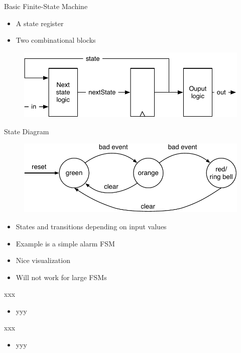 \begin{frame}[fragile]{Basic Finite-State Machine}
\begin{itemize}
\item A state register
\item Two combinational blocks
\end{itemize}
\begin{figure}
  \includegraphics[scale=\scale]{../figures/fsm}
\end{figure}
\end{frame}

\begin{frame}[fragile]{State Diagram}
\begin{figure}
  \includegraphics[scale=\scale]{../figures/state-diag-moore}
\end{figure}
\begin{itemize}
\item States and transitions depending on input values
\item Example is a simple alarm FSM
\item Nice visualization
\item Will not work for large FSMs
\end{itemize}
\end{frame}


\begin{frame}[fragile]{xxx}
\begin{itemize}
\item yyy
\end{itemize}
\end{frame}
\begin{frame}[fragile]{xxx}
\begin{itemize}
\item yyy
\end{itemize}
\end{frame}

